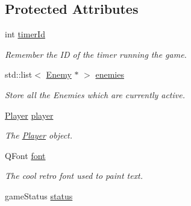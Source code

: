 \subsection*{Protected Attributes}
\begin{DoxyCompactItemize}
\item 
\hypertarget{classGameWidget_a7db65d0399ddca0f308673e5a99d663e}{
int \hyperlink{classGameWidget_a7db65d0399ddca0f308673e5a99d663e}{timerId}}
\label{classGameWidget_a7db65d0399ddca0f308673e5a99d663e}

\begin{DoxyCompactList}\small\item\em Remember the ID of the timer running the game. \end{DoxyCompactList}\item 
\hypertarget{classGameWidget_a9b3068ba5540fe4ce604af564fcf2d69}{
std::list$<$ \hyperlink{classEnemy}{Enemy} $\ast$ $>$ \hyperlink{classGameWidget_a9b3068ba5540fe4ce604af564fcf2d69}{enemies}}
\label{classGameWidget_a9b3068ba5540fe4ce604af564fcf2d69}

\begin{DoxyCompactList}\small\item\em Store all the Enemies which are currently active. \end{DoxyCompactList}\item 
\hypertarget{classGameWidget_a3d113d275b24d7fbfde4d540cd2fc920}{
\hyperlink{classPlayer}{Player} \hyperlink{classGameWidget_a3d113d275b24d7fbfde4d540cd2fc920}{player}}
\label{classGameWidget_a3d113d275b24d7fbfde4d540cd2fc920}

\begin{DoxyCompactList}\small\item\em The \hyperlink{classPlayer}{Player} object. \end{DoxyCompactList}\item 
\hypertarget{classGameWidget_a77f1e9625fe0490eccd45a9249d2eeed}{
QFont \hyperlink{classGameWidget_a77f1e9625fe0490eccd45a9249d2eeed}{font}}
\label{classGameWidget_a77f1e9625fe0490eccd45a9249d2eeed}

\begin{DoxyCompactList}\small\item\em The cool retro font used to paint text. \end{DoxyCompactList}\item 
\hypertarget{classGameWidget_ab001424d57c49c52b792cfaf5bbd45ee}{
gameStatus \hyperlink{classGameWidget_ab001424d57c49c52b792cfaf5bbd45ee}{status}}
\label{classGameWidget_ab001424d57c49c52b792cfaf5bbd45ee}


\end{DoxyCompactItemize}
